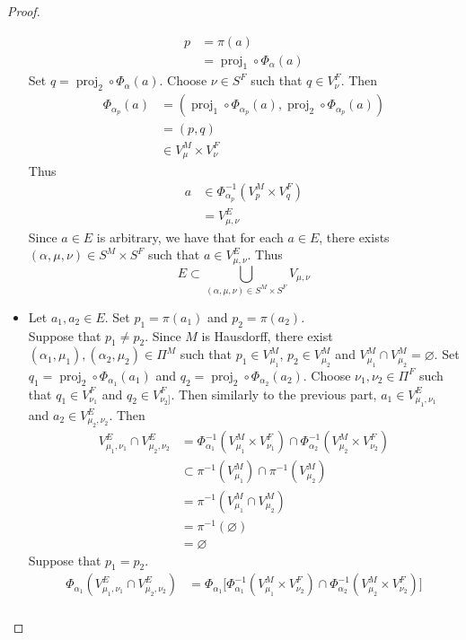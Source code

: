 \documentclass{book}
\theoremstyle{definition}
\newcommand{\al}{\alpha}
\DeclareMathOperator{\prj}{\text{proj}}
\DeclareMathOperator*{\0}{\mbf{0}}
\DeclareMathOperator*{\1}{\mbf{1}}
\begin{document}
\begin{proof}
\begin{itemize}
\begin{align*}
				p
				& = \pi(a) \\
				& = \prj_1 \circ \Phi_{\al}(a)
			\end{align*}
			Set $q = \prj_2 \circ \Phi_{\al}(a)$. Choose $\nu \in S^F$ such that $q \in V^F_{\nu}$. Then 
			\begin{align*}
				\Phi_{\al_{p}}(a)
				& = (\prj_1 \circ \Phi_{\al_{p}}(a), \prj_2 \circ \Phi_{\al_{p}}(a)) \\
				& = (p, q) \\
				& \in V_{\mu}^M \times V_{\nu}^F
			\end{align*}
			Thus 
			\begin{align*}
				a 
				& \in \Phi^{-1}_{\al_{p}}(V_{p}^M \times V_{q}^F) \\
				& = V^E_{\mu, \nu} 
			\end{align*}
			Since $a \in E$ is arbitrary, we have that for each $a \in E$, there exists $(\al, \mu, \nu) \in S^M \times S^F$ such that $a \in V^E_{\mu,\nu}$. Thus 
			$$E \subset \bigcup_{(\al, \mu, \nu) \in S^M \times S^F} V_{\mu, \nu}$$
			\item Let $a_1, a_2 \in E$. Set $p_1 = \pi(a_1)$ and $p_2 = \pi(a_2)$. \\
			Suppose that $p_1 \neq p_2$. Since $M$ is Hausdorff, there exist $(\al_1, \mu_1), (\al_2, \mu_2) \in \Pi^M$ such that $p_1 \in V^M_{\mu_1}$, $p_2 \in V^M_{\mu_2}$ and $V^M_{\mu_1} \cap V^M_{\mu_2} = \varnothing$. Set $q_1 = \prj_2 \circ \Phi_{\al_1}(a_1)$ and  $q_2 = \prj_2 \circ \Phi_{\al_2}(a_2)$. Choose $\nu_1, \nu_2 \in \Pi^F$ such that $q_1 \in V^F_{\nu_1}$ and $q_2 \in V^F_{\nu_2]}$. Then similarly to the previous part, $a_1 \in V^E_{\mu_1, \nu_1}$ and $a_2 \in V^E_{\mu_2, \nu_2}$. Then
			\begin{align*}
				V^E_{\mu_1, \nu_1} \cap V^E_{\mu_2, \nu_2}
				& = \Phi_{\al_1}^{-1}(V^M_{\mu_1} \times V^F_{\nu_1}) \cap \Phi_{\al_2}^{-1}(V^M_{\mu_2} \times V^F_{\nu_2}) \\
				& \subset \pi^{-1}(V^M_{\mu_1}) \cap \pi^{-1}(V^M_{\mu_2}) \\
				& = \pi^{-1}(V^M_{\mu_1} \cap V^M_{\mu_2}) \\
				& = \pi^{-1}(\varnothing) \\
				& = \varnothing
			\end{align*}  
			Suppose that $p_1 = p_2$. 
			\begin{align*}
				\Phi_{\al_1}( V^E_{\mu_1, \nu_1} \cap V^E_{\mu_2, \nu_2})
				& = \Phi_{\al_1} \bigg [ \Phi_{\al_1}^{-1}(V^M_{\mu_1} \times V^F_{\nu_2}) \cap \Phi_{\al_2}^{-1}(V^M_{\mu_2} \times V^F_{\nu_2}) \bigg ]\\

\end{align*}
\end{itemize}
\end{proof}
\end{document}
